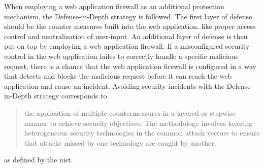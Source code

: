 When employing a web application firewall as an additional protection mechanism, the Defense-in-Depth strategy is followed.
The first layer of defense should be the counter measures built into the web application, like proper access control and neutralization of user-input.
An additional layer of defense is then put on top by employing a web application firewall.
If a misconfigured security control in the web application failes to correctly handle a specific malicious request, there is a chance that the web application firewall is configured in a way that detects and blocks the malicious request before it can reach the web application and cause an incident.
Avoiding security incidents with the Defense-in-Depth strategy corresponds to
\begin{quote}
	the application of multiple countermeasures in a layered or stepwise manner to achieve security objectives. The methodology involves layering heterogeneous security technologies in the common attack vectors to ensure that attacks missed by one technology are caught by another.
\end{quote}
as defined by the \acrfull{nist}. \cite{nist/did}
